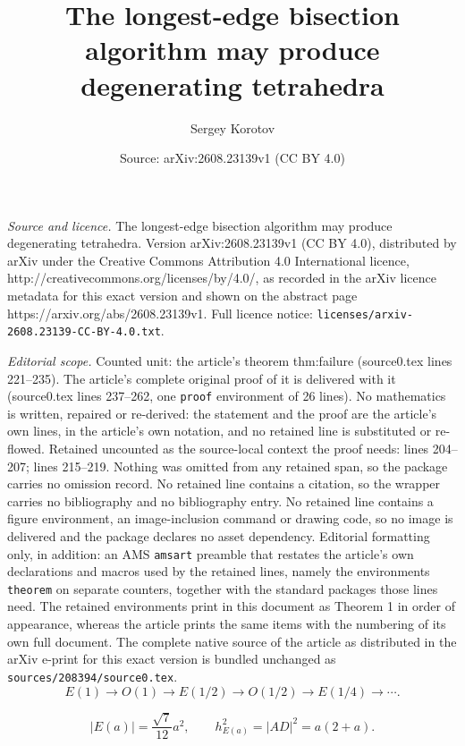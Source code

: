 \documentclass[10pt,a4paper]{amsart}
\title{The longest-edge bisection algorithm may produce degenerating tetrahedra}
\author{Sergey Korotov}
\date{Source: arXiv:2608.23139v1 (CC BY 4.0)}
\begin{document}
\maketitle

\noindent\emph{Source and licence.} The longest-edge bisection algorithm may produce degenerating tetrahedra. Version arXiv:2608.23139v1 (CC BY 4.0), distributed by arXiv under the Creative Commons Attribution 4.0 International licence, http://creativecommons.org/licenses/by/4.0/, as recorded in the arXiv licence metadata for this exact version and shown on the abstract page https://arxiv.org/abs/2608.23139v1. Full licence notice: \texttt{licenses/arxiv-2608.23139-CC-BY-4.0.txt}.\par\smallskip

\noindent\textit{Editorial scope.} Counted unit: the article's theorem thm:failure (source0.tex lines 221--235). The article's complete original proof of it is delivered with it (source0.tex lines 237--262, one \texttt{proof} environment of 26 lines). No mathematics is written, repaired or re-derived: the statement and the proof are the article's own lines, in the article's own notation, and no retained line is substituted or re-flowed.  Retained uncounted as the source-local context the proof needs: lines 204--207; lines 215--219.  Nothing was omitted from any retained span, so the package carries no omission record.  No retained line contains a citation, so the wrapper carries no bibliography and no bibliography entry.  No retained line contains a figure environment, an image-inclusion command or drawing code, so no image is delivered and the package declares no asset dependency.  Editorial formatting only, in addition: an AMS \texttt{amsart} preamble that restates the article's own declarations and macros used by the retained lines, namely the environments \texttt{theorem} on separate counters, together with the standard packages those lines need.  The retained environments print in this document as Theorem 1 in order of appearance, whereas the article prints the same items with the numbering of its own full document.  The complete native source of the article as distributed in the arXiv e-print for this exact version is bundled unchanged as \texttt{sources/208394/source0.tex}.
\begin{equation}\label{eq:chain}
E(1)\longrightarrow O(1)\longrightarrow E(1/2)\longrightarrow O(1/2)
\longrightarrow E(1/4)\longrightarrow\cdots.
\end{equation}

\begin{equation}\label{eq:volume}
|E(a)|=\frac{\sqrt7}{12}a^2,
\qquad
h_{E(a)}^2=|AD|^2=a(2+a).
\end{equation}
\end{document}
